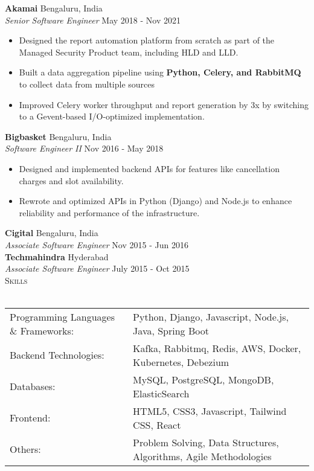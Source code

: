 \documentclass[a4paper]{article}
\newcommand{\lineunder} {
    \vspace*{-8pt} \\
    \hspace*{-18pt} \hrulefill \\
}
\newcommand{\header} [1] {
    {\hspace*{-18pt}\vspace*{6pt} \textsc{#1}}
    \vspace*{-6pt} \lineunder
}
\begin{document}
\textbf{Akamai} \hfill Bengaluru, India\\
\textit{Senior Software Engineer} \hfill May 2018 - Nov 2021\\
\vspace{-1mm}
\begin{itemize} \itemsep 1pt
	\item Designed the report automation platform from scratch as part of the Managed Security Product team, including HLD and LLD.
	\item Built a data aggregation pipeline using \textbf{Python, Celery, and RabbitMQ} to collect data from multiple sources
	\item Improved Celery worker throughput and report generation by 3x by switching to a Gevent-based I/O-optimized implementation.
\end{itemize}
\textbf{Bigbasket} \hfill Bengaluru, India\\
\textit{Software Engineer II} \hfill Nov 2016 - May 2018\\
\vspace{-1mm}
\begin{itemize} \itemsep 1pt
	\item Designed and implemented backend APIs for features like cancellation charges and slot availability.
	\item Rewrote and optimized APIs in Python (Django) and Node.js to enhance reliability and performance of the infrastructure.
\end{itemize}
\textbf{Cigital} \hfill Bengaluru, India\\
\textit{Associate Software Engineer} \hfill Nov 2015 - Jun 2016\\
\textbf{Techmahindra} \hfill Hyderabad\\
\textit{Associate Software Engineer} \hfill July 2015 - Oct 2015\\

\header{Skills}
\begin{tabular}{ l l }
	Programming Languages \& Frameworks: & Python, Django, Javascript, Node.js, Java, Spring Boot            \\
	Backend Technologies:                & Kafka, Rabbitmq, Redis, AWS, Docker, Kubernetes, Debezium         \\
	Databases:                           & MySQL, PostgreSQL, MongoDB, ElasticSearch                         \\
	Frontend:                            & HTML5, CSS3, Javascript, Tailwind CSS, React                      \\
	Others:                              & Problem Solving, Data Structures, Algorithms, Agile Methodologies \\
\end{tabular}
\vspace{2mm}
\end{document}
